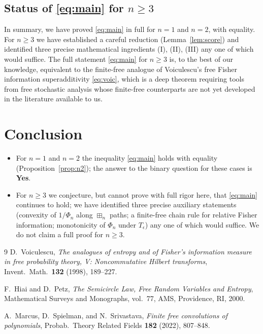 \documentclass[12pt]{article}
\theoremstyle{definition}
\begin{document}
\subsection{Status of \eqref{eq:main} for $n\geq 3$}

In summary, we have proved \eqref{eq:main} in full for $n=1$ and $n=2$, with equality. For $n\geq 3$ we have established a careful reduction (Lemma~\ref{lem:score}) and identified three precise mathematical ingredients (I), (II), (III) any one of which would suffice. The full statement \eqref{eq:main} for $n\geq 3$ is, to the best of our knowledge, equivalent to the finite-free analogue of Voiculescu's free Fisher information superadditivity \eqref{eq:voic}, which is a deep theorem requiring tools from free stochastic analysis whose finite-free counterparts are not yet developed in the literature available to us.

\section*{Conclusion}

\begin{itemize}
\item For $n=1$ and $n=2$ the inequality \eqref{eq:main} holds with equality (Proposition~\ref{prop:n2}); the answer to the binary question for these cases is \textbf{Yes}.
\item For $n\geq 3$ we conjecture, but cannot prove with full rigor here, that \eqref{eq:main} continues to hold; we have identified three precise auxiliary statements (convexity of $1/\Phi_n$ along $\boxplus_n$ paths; a finite-free chain rule for relative Fisher information; monotonicity of $\Phi_n$ under $T_\epsilon$) any one of which would suffice. We do not claim a full proof for $n\geq 3$.
\end{itemize}

\begin{thebibliography}{9}
D.~Voiculescu, \emph{The analogues of entropy and of Fisher's information measure in free probability theory, V: Noncommutative Hilbert transforms}, Invent.\ Math.\ \textbf{132} (1998), 189--227.

F.~Hiai and D.~Petz, \emph{The Semicircle Law, Free Random Variables and Entropy}, Mathematical Surveys and Monographs, vol.~77, AMS, Providence, RI, 2000.

A.~Marcus, D.~Spielman, and N.~Srivastava, \emph{Finite free convolutions of polynomials}, Probab.\ Theory Related Fields \textbf{182} (2022), 807--848.
\end{thebibliography}
\end{document}
